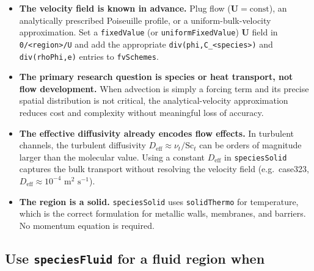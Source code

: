 \documentclass[11pt,a4paper]{article}
\newcommand{\m}{\,\text{m}}
\newcommand{\s}{\,\text{s}}
\begin{document}
\begin{itemize}[itemsep=4pt]

  \item \textbf{The velocity field is known in advance.}
        Plug flow ($\mathbf{U} = \text{const}$), an analytically prescribed
        Poiseuille profile, or a uniform-bulk-velocity approximation.
        Set a \texttt{fixedValue} (or \texttt{uniformFixedValue}) $\mathbf{U}$
        field in \texttt{0/<region>/U} and add the appropriate
        \texttt{div(phi,C\_<species>)} and \texttt{div(rhoPhi,e)} entries to
        \texttt{fvSchemes}.

  \item \textbf{The primary research question is species or heat transport,
        not flow development.}
        When advection is simply a forcing term and its precise spatial
        distribution is not critical, the analytical-velocity approximation
        reduces cost and complexity without meaningful loss of accuracy.

  \item \textbf{The effective diffusivity already encodes flow effects.}
        In turbulent channels, the turbulent diffusivity
        $D_\text{eff} \approx \nu_t / \mathrm{Sc}_t$ can be orders of magnitude
        larger than the molecular value.  Using a constant $D_\text{eff}$ in
        \texttt{speciesSolid} captures the bulk transport without resolving the
        velocity field (e.g.\ case323, $D_\text{eff} \approx 10^{-4}\,\m^2\,\s^{-1}$).

  \item \textbf{The region is a solid.}
        \texttt{speciesSolid} uses \texttt{solidThermo} for temperature, which
        is the correct formulation for metallic walls, membranes, and barriers.
        No momentum equation is required.

\end{itemize}

\subsection{Use \texttt{speciesFluid} for a fluid region when}
\end{document}
